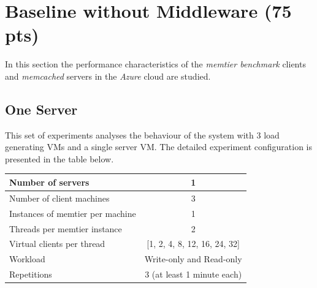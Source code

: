 \documentclass[report.tex]{subfiles}
\begin{document}
\section{Baseline without Middleware (75 pts)}\label{exp2}

In this section the performance characteristics of the \emph{memtier benchmark} clients and \emph{memcached} servers in the \emph{Azure} cloud are studied.

\subsection{One Server}\label{exp21}



This set of experiments analyses the behaviour of the system with 3 load generating VMs and a single server VM. The detailed experiment configuration is presented in the table below.


\begin{center}
	\scriptsize{
		\begin{tabular}{|l|c|}
			\hline Number of servers                & 1                        \\ 
			\hline Number of client machines        & 3                        \\ 
			\hline Instances of memtier per machine & 1                        \\ 
			\hline Threads per memtier instance     & 2                        \\
			\hline Virtual clients per thread       & [1, 2, 4, 8, 12, 16, 24, 32]\\ 
			\hline Workload                         & Write-only and Read-only \\
			\hline Repetitions                      & 3 (at least 1 minute each)\\ 
			\hline 
		\end{tabular}
	}
\end{center}
\end{document}

